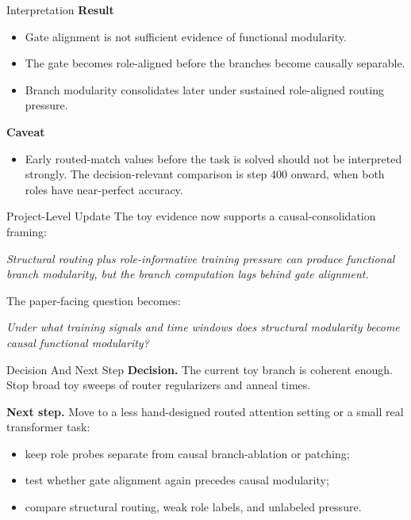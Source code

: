 \documentclass[aspectratio=169]{beamer}
\begin{document}
\begin{frame}{Interpretation}
  \textbf{Result}
  \begin{itemize}
    \item Gate alignment is not sufficient evidence of functional modularity.
    \item The gate becomes role-aligned before the branches become causally
    separable.
    \item Branch modularity consolidates later under sustained role-aligned
    routing pressure.
  \end{itemize}

  \vspace{0.8em}
  \textbf{Caveat}
  \begin{itemize}
    \item Early routed-match values before the task is solved should not be
    interpreted strongly. The decision-relevant comparison is step 400 onward,
    when both roles have near-perfect accuracy.
  \end{itemize}
\end{frame}

\begin{frame}{Project-Level Update}
  The toy evidence now supports a causal-consolidation framing:

  \vspace{0.8em}
  \begin{center}
  \textit{Structural routing plus role-informative training pressure can produce
  functional branch modularity, but the branch computation lags behind gate
  alignment.}
  \end{center}

  \vspace{0.8em}
  The paper-facing question becomes:

  \vspace{0.5em}
  \begin{center}
  \textit{Under what training signals and time windows does structural
  modularity become causal functional modularity?}
  \end{center}
\end{frame}

\begin{frame}{Decision And Next Step}
  \textbf{Decision.} The current toy branch is coherent enough. Stop broad toy
  sweeps of router regularizers and anneal times.

  \vspace{0.8em}
  \textbf{Next step.} Move to a less hand-designed routed attention setting or a
  small real transformer task:
  \begin{itemize}
    \item keep role probes separate from causal branch-ablation or patching;
    \item test whether gate alignment again precedes causal modularity;
    \item compare structural routing, weak role labels, and unlabeled pressure.
  \end{itemize}
\end{frame}
\end{document}
